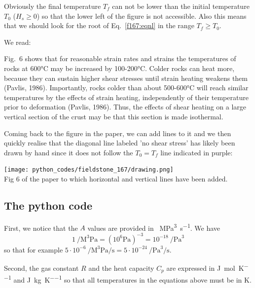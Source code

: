 Obviously the final temperature $T_f$ can not be lower than the initial temperature $T_0$
($H_s\ge 0$) so that the lower left of the figure is not accessible. Also this means that we should
look for the root of Eq.~\eqref{f167:eqnl} in the range $T_f\ge T_0$.

We read:
\begin{displayquote}
{\color{darkgray}
Fig.~6 shows that for reasonable strain rates and strains the temperatures of rocks at 600\si{\celsius} 
may be increased by 100-200\si{\celsius}. 
Colder rocks can heat more, because they can sustain higher shear stresses until
strain heating weakens them (Pavlis, 1986). Importantly, rocks colder than about 500-600\si{\celsius} 
will reach similar temperatures by the effects of strain heating, independently
of their temperature prior to deformation (Pavlis, 1986). Thus, the effects of shear heating
on a large vertical section of the crust may be that
this section is made isothermal.}
\end{displayquote}

Coming back to the figure in the paper, we can add lines to it and 
we then quickly realise that the diagonal line labeled 'no shear stress'
has likely been drawn by hand since it does not follow the $T_0=T_f$ line
indicated in purple:

\begin{center}
\texttt{[image: python\_codes/fieldstone\_167/drawing.png]} \\
{\captionfont Fig 6 of the paper to which horizontal and vertical lines 
have been added.}
\end{center}

\subsection*{The python code}

First, we notice that the $A$ values are provided in \si{\per\cubic\mega\pascal \per \second}.
We have 
\[
1~\si{\per\cubic\mega\pascal} = (10^6 \si{\pascal})^{-3} = 10^{-18}~\si{\per\cubic\pascal}
\] 
so that for example $5\cdot 10^{-6}~\si{\per\cubic\mega\pascal\per\second} 
= 5 \cdot 10^{-24}~\si{\per\cubic\pascal \per\second}$.

Second, the gas constant $R$ and the heat capacity $C_p$ are expressed in 
\si{\joule\per\mol\per\kelvin} and \si{\joule\per\kg\per\kelvin} so that 
all temperatures in the equations above must be in \si{\kelvin}.

